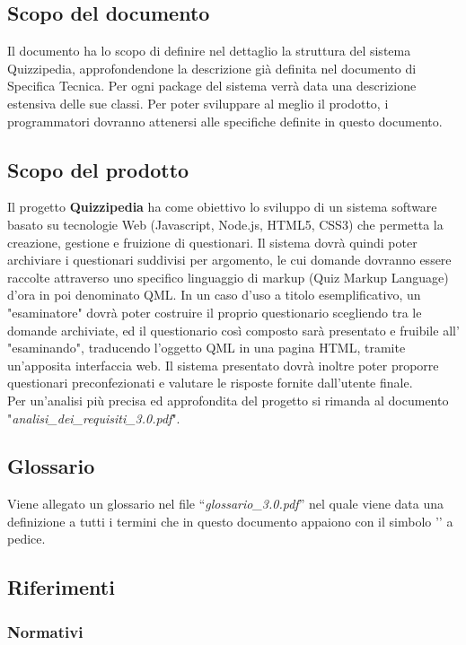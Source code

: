 \documentclass[a4paper,11pt]{article}
\begin{document}
	\subsection{Scopo del documento}
	Il documento ha lo scopo di definire nel dettaglio la struttura del sistema Quizzipedia, approfondendone la descrizione già definita nel documento di Specifica Tecnica. Per ogni package del sistema verrà data una descrizione estensiva delle sue classi. Per poter sviluppare al meglio il prodotto, i programmatori dovranno attenersi alle specifiche definite in questo documento.
	
	\subsection{Scopo del prodotto}
	Il progetto \textbf{Quizzipedia} ha come obiettivo lo sviluppo di un sistema software basato su tecnologie Web (Javascript\addglos, Node.js\addglos, HTML5\addglos, CSS3\addglos) che permetta la creazione, gestione e fruizione di questionari. Il sistema dovrà quindi poter archiviare i questionari suddivisi per argomento, le cui domande dovranno essere raccolte attraverso uno specifico linguaggio di markup (Quiz Markup Language) d'ora in poi denominato QML\addglos. In un caso d'uso a titolo esemplificativo, un "esaminatore" dovrà poter costruire il proprio questionario scegliendo tra le domande archiviate, ed il questionario così composto sarà presentato e fruibile all' "esaminando", traducendo l'oggetto QML in una pagina HTML\addglos, tramite un'apposita interfaccia web. Il sistema presentato dovrà inoltre poter proporre questionari preconfezionati e valutare le risposte fornite dall'utente finale.
	\\
	Per un'analisi più precisa ed approfondita del progetto si rimanda al documento\\ "\textit{analisi\_dei\_requisiti\_3.0.pdf}".
	\subsection{Glossario}
	Viene allegato un glossario nel file ``\textit{glossario\_3.0.pdf}'' nel quale viene data una definizione a tutti i termini che in questo documento appaiono con il simbolo '\addglos' a pedice.
	\subsection{Riferimenti}
		\subsubsection{Normativi}
\end{document}
